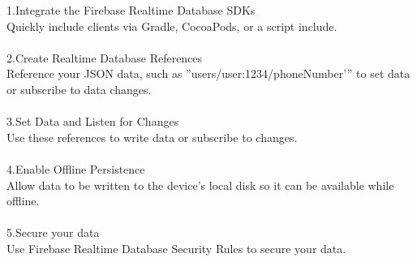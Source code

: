 1.Integrate the Firebase Realtime Database SDKs\\
Quickly include clients via Gradle, CocoaPods, or a script include.\\
\\
2.Create Realtime Database References\\
Reference your JSON data, such as ”users/user:1234/phoneNumber’” to set data or subscribe to data changes.\\
\\
3.Set Data and Listen for Changes\\
Use these references to write data or subscribe to changes.\\
\\
4.Enable Offline Persistence\\
Allow data to be written to the device’s local disk so it can be available while offline.\\
\\
5.Secure your data\\
Use Firebase Realtime Database Security Rules to secure your data.\\
\\


\newpage